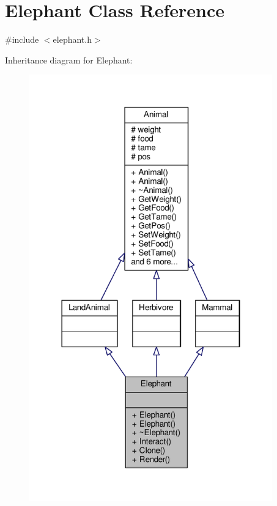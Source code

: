 \hypertarget{classElephant}{}\section{Elephant Class Reference}
\label{classElephant}


{\ttfamily \#include $<$elephant.\+h$>$}



Inheritance diagram for Elephant\+:
\nopagebreak
\begin{figure}[H]
\begin{center}
\leavevmode
\includegraphics[width=298pt]{classElephant__inherit__graph}
\end{center}
\end{figure}


